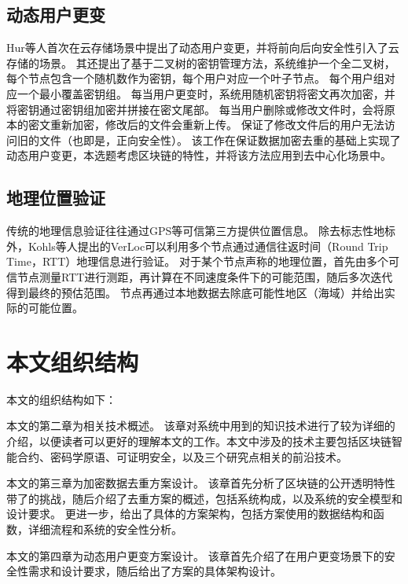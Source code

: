 \subsection{动态用户更变}

Hur等人首次在云存储场景中提出了动态用户变更，并将前向后向安全性引入了云存储的场景。
%
其还提出了基于二叉树的密钥管理方法，系统维护一个全二叉树，每个节点包含一个随机数作为密钥，每个用户对应一个叶子节点。
%
每个用户组对应一个最小覆盖密钥组。
%
每当用户更变时，系统用随机密钥将密文再次加密，并将密钥通过密钥组加密并拼接在密文尾部。
%
每当用户删除或修改文件时，会将原本的密文重新加密，修改后的文件会重新上传。
%
保证了修改文件后的用户无法访问旧的文件（也即是，正向安全性）。
%
该工作在保证数据加密去重的基础上实现了动态用户变更，本选题考虑区块链的特性，并将该方法应用到去中心化场景中。

\subsection{地理位置验证}

传统的地理信息验证往往通过GPS等可信第三方提供位置信息。
%
%
除去标志性地标外，Kohls等人提出的VerLoc可以利用多个节点通过通信往返时间（Round Trip Time，RTT）地理信息进行验证。
%
对于某个节点声称的地理位置，首先由多个可信节点测量RTT进行测距，再计算在不同速度条件下的可能范围，随后多次迭代得到最终的预估范围。
%
节点再通过本地数据去除底可能性地区（海域）并给出实际的可能位置。

\section{本文组织结构}

本文的组织结构如下：

本文的第二章为相关技术概述。
%
该章对系统中用到的知识技术进行了较为详细的介绍，以便读者可以更好的理解本文的工作。本文中涉及的技术主要包括区块链智能合约、密码学原语、可证明安全，以及三个研究点相关的前沿技术。



本文的第三章为加密数据去重方案设计。
%
该章首先分析了区块链的公开透明特性带了的挑战，随后介绍了去重方案的概述，包括系统构成，以及系统的安全模型和设计要求。
%
更进一步，给出了具体的方案架构，包括方案使用的数据结构和函数，详细流程和系统的安全性分析。


本文的第四章为动态用户更变方案设计。
%
该章首先介绍了在用户更变场景下的安全性需求和设计要求，随后给出了方案的具体架构设计。



